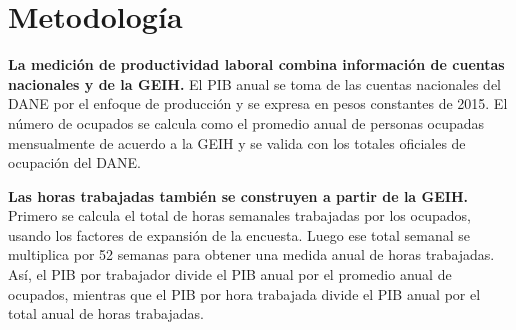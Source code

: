 \section{Metodología}

\textbf{La medición de productividad laboral combina información de cuentas nacionales y de la GEIH.} El PIB anual se toma de las cuentas nacionales del DANE por el enfoque de producción y se expresa en pesos constantes de 2015. El número de ocupados se calcula como el promedio anual de personas ocupadas mensualmente de acuerdo a la GEIH y se valida con los totales oficiales de ocupación del DANE.

\textbf{Las horas trabajadas también se construyen a partir de la GEIH.} Primero se calcula el total de horas semanales trabajadas por los ocupados, usando los factores de expansión de la encuesta. Luego ese total semanal se multiplica por 52 semanas para obtener una medida anual de horas trabajadas. Así, el PIB por trabajador divide el PIB anual por el promedio anual de ocupados, mientras que el PIB por hora trabajada divide el PIB anual por el total anual de horas trabajadas.

